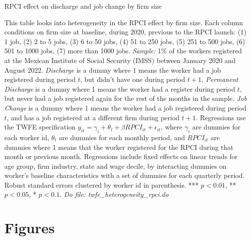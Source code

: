 \documentclass[oneside,11pt]{article}
\begin{document}
\begin{landscape}

\begin{table}[H]
    \caption{RPCI effect on discharge and job change by firm size}
    \label{twfe_job_hetero_firm_size}
    \begin{center}
    \scriptsize{}
    \end{center}
\end{table}
\scriptsize{
\noindent This table looks into heterogeneity in the RPCI effect by firm size. Each column conditions on firm size at baseline, during 2020, previous to the RPCI launch: (1) 1 job, (2) 2 to 5 jobs, (3) 6 to 50 jobs, (4) 51 to 250 jobs, (5) 251 to 500 jobs, (6) 501 to 1000 jobs, (7) more than 1000 jobs. \textit{Sample:} 1\% of the workers registered at the Mexican Institute of Social Security (IMSS) between January 2020 and August 2022. \textit{Discharge} is a dummy where 1 means the worker had a job registered during period $t$, but didn't have one during period $t+1$. \textit{Permanent Discharge} is a dummy where 1 means the worker had a register during period $t$, but never had a job registered again for the rest of the months in the sample. \textit{Job Change} is a dummy where 1 means the worker had a job registered during period $t$, and has a job registered at a different firm during period $t+1$. Regressions use the TWFE specification $y_{it} = \gamma_{i} + \theta_{t}+ \beta RPCI_{it} +\epsilon_{it}$, where $\gamma_{i}$ are dummies for each worker id, $\theta_{t}$ are dummies for each monthly period, and $RPCI_{it}$ are dummies where 1 means that the worker registered for the RPCI during that month or previous month. Regressions include fixed effects on linear trends for age group, firm industry, state and wage decile, by interacting dummies on worker's baseline characteristics with a set of dummies for each quarterly period. Robust standard errors clustered by worker id in parenthesis. *** $p<0.01$, ** $p<0.05$, * $p<0.1$.
\textit{Do file: twfe\_heterogeneity\_rpci.do}
}

\end{landscape}




\clearpage
\singlespacing

\section{Figures}
\end{document}
